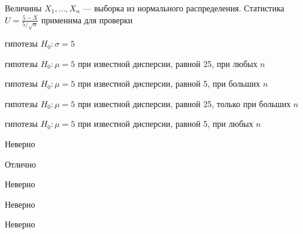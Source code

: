 
\begin{question}
Величины \(X_1,\ldots,X_n\) — выборка из нормального распределения.
Статистика \(U=\frac{5-\bar{X}}{5/\sqrt{n}}\) применима для проверки
\begin{answerlist}
  \item гипотезы \(H_0: \sigma = 5\)
  \item гипотезы \(H_0: \mu = 5\) при известной дисперсии, равной 25, при любых
\(n\)
  \item гипотезы \(H_0: \mu = 5\) при известной дисперсии, равной 5, при больших
\(n\)
  \item гипотезы \(H_0: \mu = 5\) при известной дисперсии, равной 25, только при
больших \(n\)
  \item гипотезы \(H_0: \mu = 5\) при известной дисперсии, равной 5, при любых
\(n\)
\end{answerlist}
\end{question}

\begin{solution}
\begin{answerlist}
  \item Неверно
  \item Отлично
  \item Неверно
  \item Неверно
  \item Неверно
\end{answerlist}
\end{solution}

